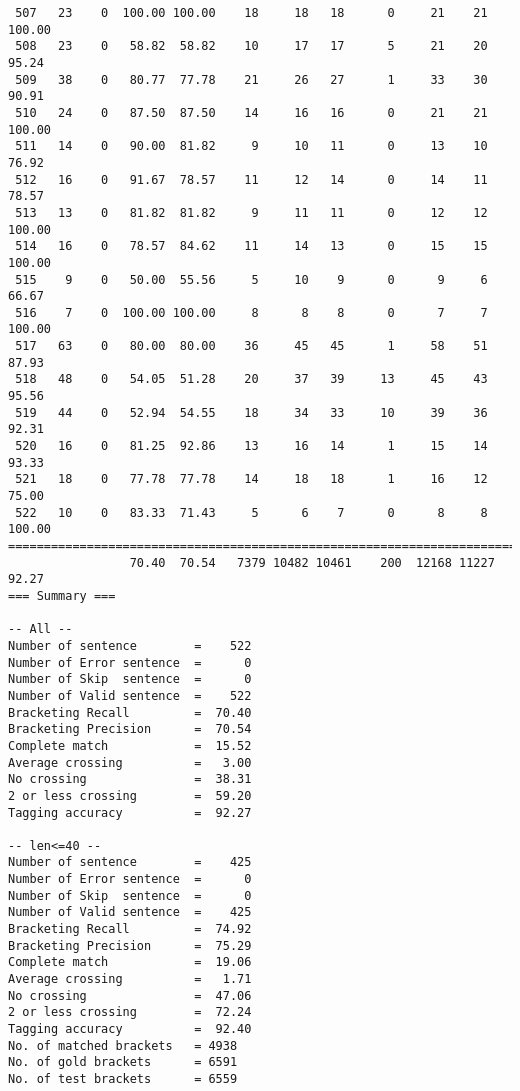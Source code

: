 \begin{verbatim}
 507   23    0  100.00 100.00    18     18   18      0     21    21   100.00
 508   23    0   58.82  58.82    10     17   17      5     21    20    95.24
 509   38    0   80.77  77.78    21     26   27      1     33    30    90.91
 510   24    0   87.50  87.50    14     16   16      0     21    21   100.00
 511   14    0   90.00  81.82     9     10   11      0     13    10    76.92
 512   16    0   91.67  78.57    11     12   14      0     14    11    78.57
 513   13    0   81.82  81.82     9     11   11      0     12    12   100.00
 514   16    0   78.57  84.62    11     14   13      0     15    15   100.00
 515    9    0   50.00  55.56     5     10    9      0      9     6    66.67
 516    7    0  100.00 100.00     8      8    8      0      7     7   100.00
 517   63    0   80.00  80.00    36     45   45      1     58    51    87.93
 518   48    0   54.05  51.28    20     37   39     13     45    43    95.56
 519   44    0   52.94  54.55    18     34   33     10     39    36    92.31
 520   16    0   81.25  92.86    13     16   14      1     15    14    93.33
 521   18    0   77.78  77.78    14     18   18      1     16    12    75.00
 522   10    0   83.33  71.43     5      6    7      0      8     8   100.00
============================================================================
                 70.40  70.54   7379 10482 10461    200  12168 11227    92.27
=== Summary ===

-- All --
Number of sentence        =    522
Number of Error sentence  =      0
Number of Skip  sentence  =      0
Number of Valid sentence  =    522
Bracketing Recall         =  70.40
Bracketing Precision      =  70.54
Complete match            =  15.52
Average crossing          =   3.00
No crossing               =  38.31
2 or less crossing        =  59.20
Tagging accuracy          =  92.27

-- len<=40 --
Number of sentence        =    425
Number of Error sentence  =      0
Number of Skip  sentence  =      0
Number of Valid sentence  =    425
Bracketing Recall         =  74.92
Bracketing Precision      =  75.29
Complete match            =  19.06
Average crossing          =   1.71
No crossing               =  47.06
2 or less crossing        =  72.24
Tagging accuracy          =  92.40
No. of matched brackets   = 4938
No. of gold brackets      = 6591
No. of test brackets      = 6559

\end{verbatim}

\normalsize

